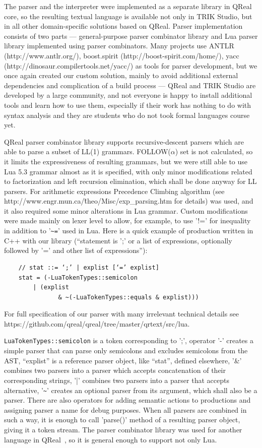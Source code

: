 \documentclass[conference]{IEEEtran}
\begin{document}
The parser and the interpreter were implemented as a separate library in QReal core, so the resulting textual language is available not only in TRIK Studio, but in all other domain-specific solutions based on QReal. Parser implementation consists of two parts --- general-purpose parser combinator library and Lua parser library implemented using parser combinators. Many projects use ANTLR (http://www.antlr.org/), boost.spirit (http://boost-spirit.com/home/), yacc (http://dinosaur.compilertools.net/yacc/) as tools for parser development, but we once again created our custom solution, mainly to avoid additional external dependencies and complication of a build process --- QReal and TRIK Studio are developed by a large community, and not everyone is happy to install additional tools and learn how to use them, especially if their work has nothing to do with syntax analysis and they are students who do not took formal languages course yet.

QReal parser combinator library supports recursive-descent parsers which are able to parse a subset of LL(1) grammars. FOLLOW($\alpha$) set is not calculated, so it limits the expressiveness of resulting grammars, but we were still able to use Lua 5.3 grammar almost as it is specified, with only minor modifications related to factorization and left recursion elimination, which shall be done anyway for LL parsers. For arithmetic expressions Precedence Climbing algorithm (see http://www.engr.mun.ca/\~theo/Misc/exp\_parsing.htm for details) was used, and it also required some minor alterations in Lua grammar. Custom modifications were made mainly on lexer level to allow, for example, to use '!=' for inequality in addition to '\verb|~=|' used in Lua. Here is a quick example of production written in C++ with our library (``statement is ';' or a list of expressions, optionally followed by '=' and other list of expressions''):
\begin{verbatim}
	// stat ::= ‘;’ | explist [‘=’ explist]
	stat = (-LuaTokenTypes::semicolon 
	    | (explist 
			   & ~(-LuaTokenTypes::equals & explist)))
\end{verbatim}

For full specification of our parser with many irrelevant technical details see https://github.com/qreal/qreal/tree/master/qrtext/src/lua. 

\verb|LuaTokenTypes::semicolon| is a token corresponding to ';', operator '-' creates a simple parser that can parse only semicolons and excludes semicolons from the AST, ``explist'' is a reference parser object, like ``stat'', defined elsewhere, '\&' combines two parsers into a parser which accepts concatenation of their corresponding strings, '|' combines two parsers into a parser that accepts alternative, '\verb|~|' creates an optional parser from its argument, which shall also be a parser. There are also operators for adding semantic actions to productions and assigning parser a name for debug purposes. When all parsers are combined in such a way, it is enough to call 'parse()' method of a resulting parser object, giving it a token stream. The parser combinator library was used for another language in QReal~\cite{tikhonova2015generation}, so it is general enough to support not only Lua.
\end{document}
